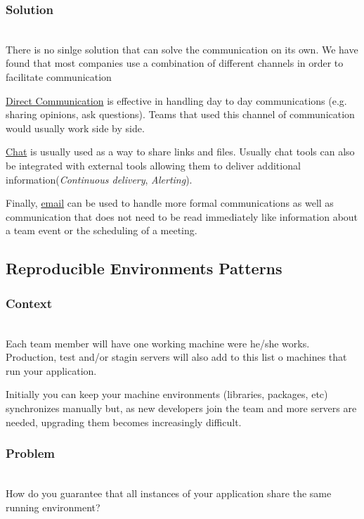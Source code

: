 \documentclass{llncs}
\begin{document}
		\subsubsection{Solution}~\\

		There is no sinlge solution that can solve the communication on its own. We have found that most companies use a combination of different channels in order to facilitate communication

		\underline{Direct Communication} is effective in handling day to day communications (e.g. sharing opinions, ask questions). Teams that used this channel of communication would usually work side by side.

		\underline{Chat} is usually used as a way to share links and files. Usually chat tools can also be integrated with external tools allowing them to deliver additional information(\textit{Continuous delivery}, \textit{Alerting}).

		Finally, \underline{email} can be used to handle more formal communications as well as communication that does not need to be read immediately like information about a team event or the scheduling of a meeting.

	\subsection{Reproducible Environments Patterns}
		\subsubsection{Context}~\\
			Each team member will have one working machine were he/she works. Production, test and/or stagin servers will also add to this list o machines that run your application.

			Initially you can keep your machine environments (libraries, packages, etc) synchronizes manually but, as new developers join the team and more servers are needed, upgrading them becomes increasingly difficult.

  		\subsubsection{Problem}~\\
			How do you guarantee that all instances of your application share the same running environment?
\end{document}
